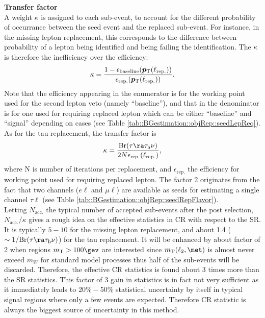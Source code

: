 
\noindent \textbf{Transfer factor} \\
A weight $\kappa$ is assigned to each sub-event, to account for the different probability of occurrance between the seed event and the replaced sub-event. For instance, in the missing lepton replacement, this corresponds to the difference between probability of a lepton being identified and being failing the identification. The $\kappa$ is therefore the inefficiency over the efficiency:
$$
\kappa = \frac{
  1-\epsilon_{\mathrm{baseline}}  (\bm{p}_{\mathrm{T}}(\ell_{\mathrm{rep.}}))
}{
  \epsilon_{\mathrm{rep.}} (\bm{p}_{\mathrm{T}}(\ell_{\mathrm{rep.}}))
}.
$$
Note that the efficiency appearing in the enumerator is for the working point used for the second lepton veto (namely ``baseline''), and that in the denominator is for one used for requiring replaced lepton which can be either ``baseline'' and ``signal'' depending on cases (see Table \ref{tab::BGestimation::objRep::seedLepReq}). \\

As for the tau replacement, the transfer factor is 
$$
\kappa = \frac{
  \mathrm{Br}(\tau\ra\tau_{\mathrm{h}}\nu)
}{
  2N\epsilon_{\mathrm{rep.}}(\ell_{\mathrm{rep.}})
},
$$
where N is number of iterations per replacement, and $\epsilon_{\mathrm{rep.}}$ the efficiency for working point used for requiring replaced lepton. The factor 2 originates from the fact that two channels ($e\ell$ and $\mu\ell$) are available as seeds for estimating a single channel $\tau\ell$ (see Table \ref{tab::BGestimation::objRep::seedRepFlavor}). \\

Letting $N_{\mathrm{acc.}}$ the typical number of accepted sub-events after the post selection, $N_{\mathrm{acc.}}/\kappa$ gives a rough idea on the effective statistics in CR with respect to the SR. It is typically $5-10$ for the missing lepton replacement, and about 1.4 ($\sim 1/\mathrm{Br}(\tau\ra\tau_{\mathrm{h}}\nu)$) for the tau replacement. It will be enhanced by about factor of 2 when regions $\mt>100\gev$ are interested since $\mt(\ell_{2},\met)$ is almost never exceed $m_W$ for standard model processes thus half of the sub-events will be discarded. Therefore, the effective CR statistics is found about 3 times more than the SR statistics. This factor of 3 gain in statistics is in fact not very sufficient as it immediately leads to $20\%-50\%$ statistical uncertainty by itself in typical signal regions where only a few events are expected. Therefore CR statistic is always the biggest source of uncertainty in this method. \\


